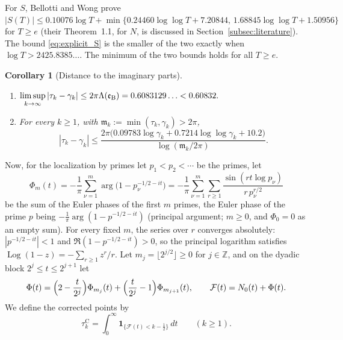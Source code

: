 \documentclass[11pt,a4paper]{article}
\makeatletter
\numberwithin{equation}{section}
\DeclareRobustCommand{\CGref}[1]{\ref{#1}}
\DeclareRobustCommand{\CGeqref}[1]{\eqref{#1}}
\DeclareRobustCommand{\CGcite}[2][]{\if\relax\detokenize{#1}\relax\cite{#2}\else\cite[#1]{#2}\fi}
\let\CG@origref\ref
\let\CG@origeqref\eqref
\newcommand{\CG@gettip}[1]{\@ifundefined{CGTip@#1}{#1}{\csname CGTip@#1\endcsname}}
\newcommand{\CG@getbib}[1]{\@ifundefined{CGBib@#1}{#1}{\csname CGBib@#1\endcsname}}
\DeclareRobustCommand{\CGref}[1]{\pdftooltip{\CG@origref{#1}}{\CG@gettip{#1}}}
\DeclareRobustCommand{\CGeqref}[1]{\pdftooltip{\CG@origeqref{#1}}{\CG@gettip{#1}}}
\DeclareRobustCommand{\CGcite}[2][]{\pdftooltip{\if\relax\detokenize{#1}\relax\cite{#2}\else\cite[#1]{#2}\fi}{\CG@getbib{#2}}}
\newtheorem{corollary}[theorem]{Corollary}
\theoremstyle{definition}
\theoremstyle{remark}
\newcommand{\Nz}{N_0} %
\newcommand{\Fc}{\mathcal F}
\newcommand{\Ph}{\Phi}
\newcommand{\Ind}{\mathbf 1}
\newcommand{\eB}{\mathfrak e_{\rm B}}
\newcommand{\Z}{\mathbb Z}
\makeatother
\begin{document}
For $S$, Bellotti and Wong \CGcite[Cor.~1.5]{BellottiWong2025} prove $|S(T)|\le0.10076\log T+\min\{0.24460\log\log T+7.20844,\,1.68845\log\log T+1.50956\}$ for $T\ge e$ (their Theorem~1.1, for $N$, is discussed in Section~\CGref{subsec:literature}). The bound \CGeqref{eq:explicit_S} is the smaller of the two exactly when $\log T>2425.8385\ldots$. The minimum of the two bounds holds for all $T\ge e$.

\begin{corollary}[Distance to the imaginary parts]\label{cor:distance}
\begin{enumerate}[label=(\alph*)]
\item $\displaystyle\limsup_{k\to\infty}|\tau_k-\gamma_k|\le2\pi\Lambda(\eB)=0.6083129\ldots<0.60832 .$
\item For every $k\ge1$, with $\mathfrak m_k:=\min(\tau_k,\gamma_k)>2\pi$,
\begin{equation}
|\tau_k-\gamma_k|\le\frac{2\pi\bigl(0.09783\log\gamma_k+0.7214\log\log\gamma_k+10.2\bigr)}{\log(\mathfrak m_k/2\pi)} .
\label{eq:distance_explicit}
\end{equation}
\end{enumerate}
\end{corollary}

Now, for the localization by primes let $p_1<p_2<\cdots$ be the primes, let
\begin{equation}
\Ph_m(t)=-\frac1\pi\sum_{\nu=1}^m\arg\bigl(1-p_\nu^{-1/2-it}\bigr)=-\frac1\pi\sum_{\nu=1}^m\sum_{r\ge1}\frac{\sin(rt\log p_\nu)}{r\,p_\nu^{r/2}}
\label{eq:Euler_phase}
\end{equation}
be the sum of the Euler phases of the first $m$ primes, the Euler phase of the prime $p$ being $-\frac1\pi\arg(1-p^{-1/2-it})$ (principal argument; $m\ge0$, and $\Ph_0=0$ as an empty sum). For every fixed $m$, the series over $r$ converges absolutely: $|p^{-1/2-it}|<1$ and $\Re(1-p^{-1/2-it})>0$, so the principal logarithm satisfies $\operatorname{Log}(1-z)=-\sum_{r\ge1}z^r/r$. Let $m_j=\lfloor2^{j/2}\rfloor\ge0$ for $j\in\Z$, and on the dyadic block $2^j\le t\le2^{j+1}$ let
\begin{equation}
\Ph(t)=\Bigl(2-\frac t{2^j}\Bigr)\Ph_{m_j}(t)+\Bigl(\frac t{2^j}-1\Bigr)\Ph_{m_{j+1}}(t),\qquad \Fc(t)=\Nz(t)+\Ph(t).
\label{eq:F_def}
\end{equation}
We define the corrected points by
\begin{equation}
\tau_{k}^{\mathrm C}=\int_0^\infty\Ind_{\{\Fc(t)<k-\frac12\}}\,dt\qquad(k\ge1).
\label{eq:xk_def}
\end{equation}
\end{document}
